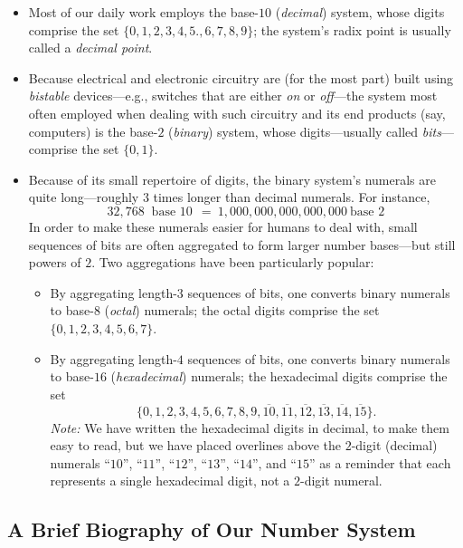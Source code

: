 \begin{itemize}
\item
Most of our daily work employs the base-$10$ ({\it decimal}) system,
whose digits comprise the set $\{0, 1, 2, 3, 4, 5., 6, 7, 8, 9\}$; the
system's radix point is usually called a {\em decimal point}.

\item
Because electrical and electronic circuitry are (for the most part)
built using {\it bistable} devices---e.g., switches that are either
{\em on} or {\em off}---the system most often employed when dealing
with such circuitry and its end products (say, computers) is the
base-$2$ ({\it binary}) system, whose digits---usually called {\it
  bits}---comprise the set $\{0, 1\}$.

\item
Because of its small repertoire of digits, the binary system's
numerals are quite long---roughly $3$ times longer than decimal
numerals.  For instance,
\[ 32,768 \ \mbox{ base $10$} \ \ = \ 1,000,000,000,000,000 \ \mbox{
  base $2$}
\]
In order to make these numerals easier for humans to deal with, small
sequences of bits are often aggregated to form larger number bases---but
still powers of $2$.  Two aggregations have been particularly popular:
  \begin{itemize}
  \item
By aggregating length-$3$ sequences of bits, one converts binary
numerals to base-$8$ ({\it octal}) numerals; the octal digits comprise
the set $\{0, 1, 2, 3, 4, 5, 6, 7\}$.
  \item
By aggregating length-$4$ sequences of bits, one converts binary
numerals to base-$16$ ({\it hexadecimal}) numerals; the hexadecimal
digits comprise the set
\[ \{0, 1, 2, 3, 4, 5, 6, 7, 8, 9, \overline{10}, \overline{11},
\overline{12}, \overline{13}, \overline{14}, \overline{15}\}.
\]
{\it Note:} We have written the hexadecimal digits in decimal, to make
them easy to read, but we have placed overlines above the $2$-digit
(decimal) numerals ``$10$'', ``$11$'', ``$12$'', ``$13$'', ``$14$'',
and ``$15$'' as a reminder that each represents a single hexadecimal
digit, not a $2$-digit numeral.
  \end{itemize}
\end{itemize}


\subsection{A Brief Biography of Our Number System}
\label{sec:number-taxonomy}


